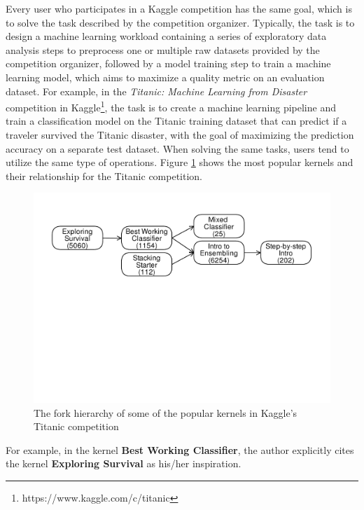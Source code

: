 Every user who participates in a Kaggle competition has the same goal, which is to solve the task described by the competition organizer.
Typically, the task is to design a machine learning workload containing a series of exploratory data analysis steps to preprocess one or multiple raw datasets provided by the competition organizer, followed by a model training step to train a machine learning model, which aims to maximize a quality metric on an evaluation dataset.
For example, in the \textit{Titanic: Machine Learning from Disaster} competition in Kaggle\footnote{https://www.kaggle.com/c/titanic}, the task is to create a machine learning pipeline and train a classification model on the Titanic training dataset that can predict if a traveler survived the Titanic disaster, with the goal of maximizing the prediction accuracy on a separate test dataset.
When solving the same tasks, users tend to utilize the same type of operations.
Figure \ref{fig-titanic-script-hierarchy} shows the most popular kernels and their relationship for the Titanic competition.
\begin{figure}
\centering
\includegraphics[width=\columnwidth]{../images/kaggle-titanic-scripts-graph}
\caption{The fork hierarchy of some of the popular kernels in Kaggle's Titanic competition}
\label{fig-titanic-script-hierarchy}
\end{figure}
For example, in the kernel \textbf{Best Working Classifier}, the author explicitly cites the kernel \textbf{Exploring Survival} as his/her inspiration.
